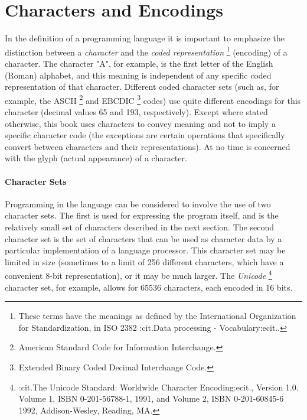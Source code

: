 \chapter{Characters and Encodings}\label{refencod}
 In the definition of a programming language it is important to
emphasize the distinction between a \emph{character} and the
\emph{coded representation}
\footnote{
These terms have the meanings as defined by the International
Organization for Standardization, in ISO 2382 :cit.Data processing
- Vocabulary:ecit..
}
(encoding) of a character.
The character "A", for example, is the first letter of the English
(Roman) alphabet, and this meaning is independent of any specific coded
representation of that character.
Different coded character sets (such as, for example, the ASCII
\footnote{
American Standard Code for Information Interchange.
}
and EBCDIC
\footnote{
Extended Binary Coded Decimal Interchange Code.
}
codes) use quite different encodings for this character (decimal
values 65 and 193, respectively).
 Except where stated otherwise, this
book
uses characters to convey meaning and not to imply a specific character
code (the exceptions are certain operations that specifically convert
between characters and their representations).
At no time is \nr{} concerned with the glyph (actual appearance) of
a character.
\subsubsection{Character Sets}
 Programming in the \nr{} language can be considered to involve the
use of two character sets.
The first is used for expressing the \nr{} program itself, and is the
relatively small set of characters described in the next section.
The second character set is the set of characters that can be used as
character data by a particular implementation of a \nr{} language
processor.
This character set may be limited in size (sometimes to a limit of 256
different characters, which have a convenient 8-bit representation), or
it may be much larger.  The \emph{Unicode}
\footnote{
:cit.The Unicode Standard: Worldwide Character Encoding:ecit.,
Version 1.0.  Volume 1, ISBN 0-201-56788-1, 1991, and Volume 2, ISBN
0-201-60845-6 1992, Addison-Wesley, Reading, MA.
}
character set, for example, allows for 65536 characters, each encoded in
16 bits.
 
